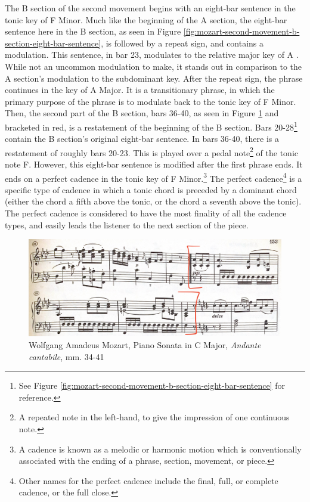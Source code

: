 The B section of the second movement begins with an eight-bar sentence in the tonic key of F Minor. Much like the beginning of the A section, the eight-bar sentence here in the B section, as seen in Figure \ref{fig:mozart-second-movement-b-section-eight-bar-sentence}\autocite{Henle_1977}, is followed by a repeat sign, and contains a modulation. This sentence, in bar 23, modulates to the relative major key of A \musFlat{}. While not an uncommon modulation to make, it stands out in comparison to the A section's modulation to the subdominant key. After the repeat sign, the phrase continues in the key of A\musFlat{} Major. It is a transitionary phrase, in which the primary purpose of the phrase is to modulate back to the tonic key of F Minor. Then, the second part of the B section, bars 36-40, as seen in Figure \ref{fig:mozart-second-movement-second-half-b-section}\autocite{Henle_1977} and bracketed in red, is a restatement of the beginning of the B section. Bars 20-28\footnote{See Figure \ref{fig:mozart-second-movement-b-section-eight-bar-sentence} for reference.} contain the B section's original eight-bar sentence. In bars 36-40, there is a restatement of roughly bars 20-23. This is played over a pedal note\footnote{A repeated note in the left-hand, to give the impression of one continuous note.} of the tonic note F. However, this eight-bar sentence is modified after the first phrase ends. It ends on a perfect cadence\autocite{Nagley_Whittall_2011} in the tonic key of F Minor.\footnote{A cadence is known as a melodic or harmonic motion which is conventionally associated with the ending of a phrase, section, movement, or piece.} The perfect cadence\footnote{Other names for the perfect cadence include the final, full, or complete cadence, or the full close.} is a specific type of cadence in which a tonic chord is preceded by a dominant chord (either the chord a fifth above the tonic, or the chord a seventh above the tonic). The perfect cadence is considered to have the most finality of all the cadence types, and easily leads the listener to the next section of the piece.

\begin{figure}
	\centering
	\includegraphics[width=\textwidth]{figures/mozart-second-movement-second-half-b-section.jpg}
	\caption{Wolfgang Amadeus Mozart, Piano Sonata in C Major, \textit{Andante cantabile}, mm. 34-41}
	\label{fig:mozart-second-movement-second-half-b-section}
\end{figure}

